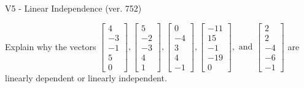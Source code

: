 \begin{exercise}
  \begin{exerciseTitle}V5 - Linear Independence (ver. 752)\end{exerciseTitle}
  \begin{exerciseStatement}
    Explain why the vectors \(\left[\begin{array}{r}
4 \\
-3 \\
-1 \\
5 \\
0
\end{array}\right] , \left[\begin{array}{r}
5 \\
-2 \\
-3 \\
4 \\
1
\end{array}\right] , \left[\begin{array}{r}
0 \\
-4 \\
3 \\
4 \\
-1
\end{array}\right] , \left[\begin{array}{r}
-11 \\
15 \\
-1 \\
-19 \\
0
\end{array}\right] , \text{ and } \left[\begin{array}{r}
2 \\
2 \\
-4 \\
-6 \\
-1
\end{array}\right]\) are linearly dependent or linearly independent.	



\end{exerciseStatement}
\end{exercise}

